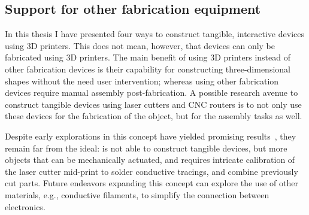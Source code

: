     \subsection{Support for other fabrication equipment}
      In this thesis I have presented four \pap ways to construct tangible,
      interactive devices using 3D printers. This does not mean, however, that
      \pap devices can only be fabricated using 3D printers. The main benefit of
      using 3D printers instead of other fabrication devices is their capability
      for constructing three-dimensional shapes without the need user
      intervention; whereas using other fabrication devices require manual
      assembly post-fabrication. A possible research avenue to construct
      tangible devices using laser cutters and CNC routers is to not only use
      these devices for the fabrication of the object, but for the assembly
      tasks as well.

      Despite early explorations in this concept have yielded promising
      results~\cite{Katakura:2019, Nisser:2021}, they remain far from the \papf
      ideal: \cite{Katakura:2019} is not able to construct tangible devices, but
      more objects that can be mechanically actuated, and \cite{Nisser:2021}
      requires intricate calibration of the laser cutter mid-print to solder
      conductive tracings, and combine previously cut parts. Future endeavors
      expanding this concept can explore the use of other materials, e.g.,
      conductive filaments, to simplify the connection between electronics.